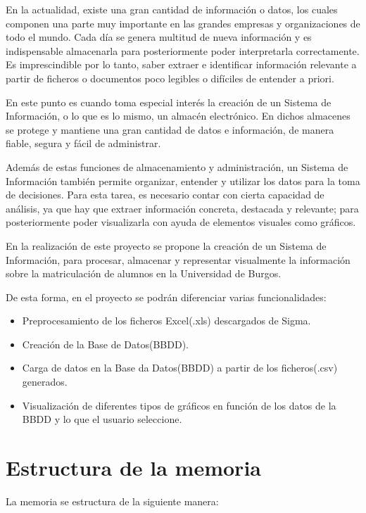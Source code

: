 

En la actualidad, existe una gran cantidad de información o datos, los cuales componen una parte muy importante en las grandes  empresas y organizaciones de todo el mundo.
Cada día se genera multitud de nueva información y es indispensable almacenarla para posteriormente poder interpretarla correctamente. Es imprescindible por lo tanto, saber extraer e identificar información relevante a partir de ficheros o documentos poco legibles o difíciles de entender a priori.


En este punto es cuando toma especial interés la creación de un Sistema de Información, o lo que es lo mismo, un almacén electrónico. En dichos almacenes se protege y mantiene una gran cantidad de datos e información, de manera fiable, segura y fácil de administrar.

Además de estas funciones de almacenamiento y administración, un Sistema de Información también permite organizar, entender y utilizar los datos para la toma de decisiones.
Para esta tarea, es necesario contar con cierta capacidad de análisis, ya que hay que extraer información concreta, destacada y relevante; para posteriormente poder visualizarla con ayuda de elementos visuales como gráficos.

En la realización de este proyecto se propone la creación de un Sistema de Información, para procesar, almacenar y representar visualmente la información sobre la matriculación de alumnos en la Universidad de Burgos. 


De esta forma, en el proyecto se podrán diferenciar varias funcionalidades:

\begin{itemize}
	\item Preprocesamiento de los ficheros Excel(.xls) descargados de Sigma.
	\item Creación de la Base de Datos(BBDD).
	\item Carga de datos en la Base da Datos(BBDD) a partir de los ficheros(.csv) generados.
	\item Visualización de diferentes tipos de gráficos en función de los datos de la BBDD y lo que el usuario seleccione.
\end{itemize}


\section{Estructura de la memoria}\label{estructura-de-la-memoria}
La memoria se estructura de la siguiente manera:

